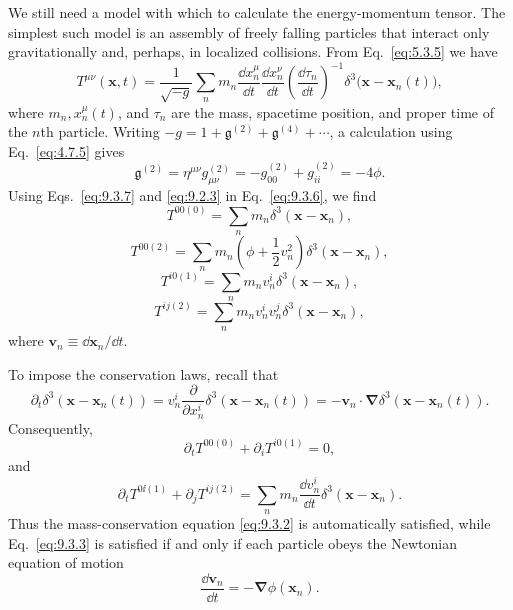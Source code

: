 We still need a model with which to calculate the energy-momentum tensor.
The simplest such model is an assembly of freely falling particles that
interact only gravitationally and, perhaps, in localized collisions. From
Eq.~\eqref{eq:5.3.5} we have
\begin{equation}
  T^{\mu\nu}(\mathbf x,t)
  =
  \frac1{\sqrt{-g}}
  \sum_n m_n
  \frac{\dd x_n^\mu}{\dd t}
  \frac{\dd x_n^\nu}{\dd t}
  \left(\frac{\dd\tau_n}{\dd t}\right)^{-1}
  \delta^3\!\bigl(\mathbf x-\mathbf x_n(t)\bigr),
  \tag{9.3.6}\label{eq:9.3.6}
\end{equation}
where \(m_n,x_n^\mu(t)\), and \(\tau_n\) are the mass, spacetime position,
and proper time of the \(n\)th particle. Writing
\(-g=1+\mathfrak g^{(2)}+\mathfrak g^{(4)}+\cdots\), a calculation using
Eq.~\eqref{eq:4.7.5} gives
\begin{equation}
  \mathfrak g^{(2)}
  =
  \eta^{\mu\nu}g_{\mu\nu}^{(2)}
  =
  -g_{00}^{(2)}+g_{ii}^{(2)}
  =
  -4\phi.
  \tag{9.3.7}\label{eq:9.3.7}
\end{equation}
Using Eqs.~\eqref{eq:9.3.7} and \eqref{eq:9.2.3} in
Eq.~\eqref{eq:9.3.6}, we find
\begin{equation}
  T^{00(0)}
  =
  \sum_n m_n\delta^3(\mathbf x-\mathbf x_n),
  \tag{9.3.8}\label{eq:9.3.8}
\end{equation}
\begin{equation}
  T^{00(2)}
  =
  \sum_n m_n
  \left(\phi+\frac12v_n^2\right)
  \delta^3(\mathbf x-\mathbf x_n),
  \tag{9.3.9}\label{eq:9.3.9}
\end{equation}
\begin{equation}
  T^{i0(1)}
  =
  \sum_n m_n v_n^i\delta^3(\mathbf x-\mathbf x_n),
  \tag{9.3.10}\label{eq:9.3.10}
\end{equation}
\begin{equation}
  T^{ij(2)}
  =
  \sum_n m_n v_n^iv_n^j\delta^3(\mathbf x-\mathbf x_n),
  \tag{9.3.11}\label{eq:9.3.11}
\end{equation}
where \(\mathbf v_n\equiv\dd\mathbf x_n/\dd t\).

To impose the conservation laws, recall that
\[
  \partial_t\delta^3(\mathbf x-\mathbf x_n(t))
  =
  v_n^i\frac{\partial}{\partial x_n^i}
  \delta^3(\mathbf x-\mathbf x_n(t))
  =
  -\mathbf v_n\cdot\boldsymbol\nabla
  \delta^3(\mathbf x-\mathbf x_n(t)).
\]
Consequently,
\[
  \partial_tT^{00(0)}+\partial_iT^{i0(1)}=0,
\]
and
\[
  \partial_tT^{0\ii(1)}+\partial_jT^{ij(2)}
  =
  \sum_n m_n\frac{\dd v_n^i}{\dd t}
  \delta^3(\mathbf x-\mathbf x_n).
\]
Thus the mass-conservation equation \eqref{eq:9.3.2} is automatically
satisfied, while Eq.~\eqref{eq:9.3.3} is satisfied if and only if each
particle obeys the Newtonian equation of motion
\begin{equation}
  \frac{\dd\mathbf v_n}{\dd t}
  =
  -\boldsymbol\nabla\phi(\mathbf x_n).
  \tag{9.3.12}\label{eq:9.3.12}
\end{equation}

